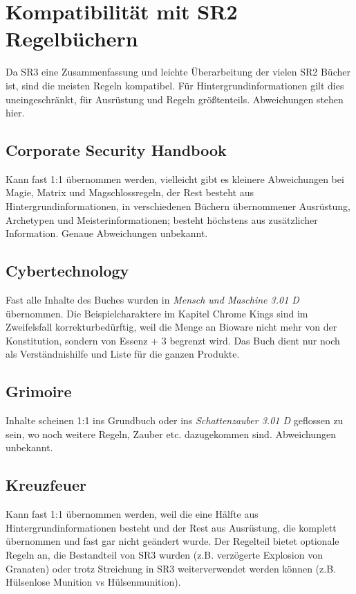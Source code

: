 \documentclass[a4paper]{scrartcl}
\begin{document}
\section{Kompatibilität mit SR2 Regelbüchern}
Da SR3 eine Zusammenfassung und leichte Überarbeitung der vielen SR2 Bücher ist, sind die meisten Regeln kompatibel. Für Hintergrundinformationen gilt dies uneingeschränkt, für Ausrüstung und Regeln größtenteils.
Abweichungen stehen hier.

\subsection{Corporate Security Handbook}
Kann fast 1:1 übernommen werden, vielleicht gibt es kleinere Abweichungen bei Magie, Matrix und Magschlossregeln, der Rest besteht aus Hintergrundinformationen, in verschiedenen Büchern übernommener Ausrüstung, Archetypen und Meisterinformationen; besteht höchstens aus zusätzlicher Information. Genaue Abweichungen unbekannt.

\subsection{Cybertechnology}
Fast alle Inhalte des Buches wurden in \textit{Mensch und Maschine 3.01 D} übernommen. Die Beispielcharaktere im Kapitel Chrome Kings sind im Zweifelsfall korrekturbedürftig, weil die Menge an Bioware nicht mehr von der Konstitution, sondern von Essenz + 3 begrenzt wird. Das Buch dient nur noch als Verständnishilfe und Liste für die ganzen Produkte.

\subsection{Grimoire}
Inhalte scheinen 1:1 ins Grundbuch oder ins \textit{Schattenzauber 3.01 D} geflossen zu sein, wo noch weitere Regeln, Zauber etc. dazugekommen sind. Abweichungen unbekannt.

\subsection{Kreuzfeuer}
Kann fast 1:1 übernommen werden, weil die eine Hälfte aus Hintergrundinformationen besteht und der Rest aus Ausrüstung, die komplett übernommen und fast gar nicht geändert wurde. Der Regelteil bietet optionale Regeln an, die Bestandteil von SR3 wurden (z.B. verzögerte Explosion von Granaten) oder trotz Streichung in SR3 weiterverwendet werden können (z.B. Hülsenlose Munition vs Hülsenmunition).
\end{document}
